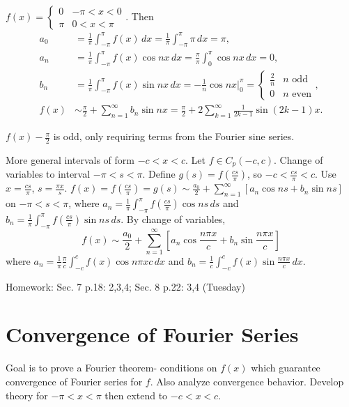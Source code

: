\documentclass[]{article}
\begin{document}
\begin{example}
	$f(x) = \begin{cases} 0 & -\pi<x<0 \\ \pi & 0<x<\pi \end{cases}$. Then	\begin{align*}a_0 &= \frac{1}{\pi} \int_{-\pi}^\pi f(x) \, dx = \frac{1}{\pi} \int_{-\pi}^\pi \pi \, dx = \pi, \\
	a_n &= \frac{1}{\pi} \int_{-\pi}^\pi f(x) \cos{nx} \, dx = \frac{\pi}{\pi} \int_0^\pi \cos{nx}\, dx = 0, \\
	b_n &= \frac{1}{\pi} \int_{-\pi}^\pi f(x) \sin{nx} \, dx = - \frac{1}{n} \cos{nx} \big\rvert_0^\pi = \begin{cases} \frac{2}{n} & n \text{ odd} \\ 0 & n \text{ even} \end{cases}, \\
	f(x) &\sim \frac{\pi}{2} + \sum_{n=1}^\infty b_n \sin{nx} = \frac{\pi}{2} + 2\sum_{k=1}^\infty \frac{1}{2k-1} \sin{(2k-1)x} .
	\end{align*}
	\begin{note}
		$f(x) - \frac{\pi}{2}$ is odd, only requiring terms from the Fourier sine series.
	\end{note}
\end{example}

More general intervals of form $-c<x<c$.
Let $f\in C_p(-c,c)$. Change of variables to interval $-\pi < s <\pi$.
Define $g(s) = f(\frac{cs}{\pi})$, so $-c<\frac{cs}{\pi}<c$. Use $x=\frac{cs}{\pi}$, $s=\frac{\pi x}{s}$.
$f(x) = f(\frac{cs}{\pi}) = g(s) \sim \frac{a_0}{2} + \sum_{n=1}^\infty \left[ a_n \cos{ns} + b_n \sin{ns} \right]$ on $-\pi < s< \pi$, where $a_n = \frac{1}{\pi} \int_{-\pi}^\pi f(\frac{cs}{\pi}) \cos{ns} \, ds$ and $b_n = \frac{1}{\pi} \int_{-\pi}^\pi f(\frac{cs}{\pi}) \sin{ns} \, ds$. By change of variables, $$ f(x) \sim \frac{a_0}{2} + \sum_{n=1}^\infty \left[ a_n \cos{\frac{n\pi x}{c}} + b_n \sin{\frac{n\pi x}{c}} \right]$$ where $a_n = \frac{1}{\pi} \frac{\pi}{c} \int_{-c}^c f(x) \cos{n\pi x}{c} \, dx$ and $b_n = \frac{1}{c} \int_{-c}^c f(x) \sin{\frac{n\pi x}{c}} \, dx$.

Homework: Sec. 7 p.18: 2,3,4; Sec. 8 p.22: 3,4 (Tuesday)

\section{Convergence of Fourier Series}

Goal is to prove a Fourier theorem-
conditions on $f(x)$ which guarantee convergence of Fourier series for $f$.
Also analyze convergence behavior. Develop theory for $-\pi<x<\pi$ then extend to $-c<x<c$.
\end{document}
